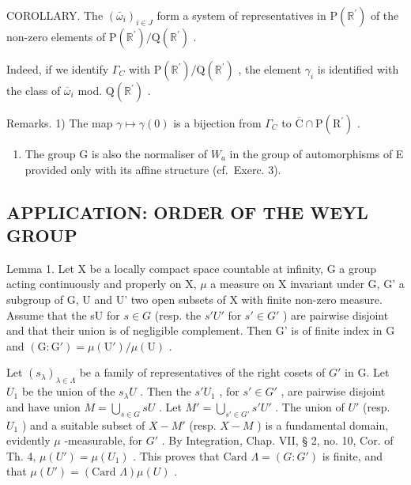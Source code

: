 COROLLARY. The \((\bar{\omega}_i)_{i\in J}\) form a system of representatives in \(\mathrm{P}(\mathbb{R}^{\prime})\) of the non-zero elements of \(\mathrm{P}(\mathbb{R}^{\prime}) / \mathrm{Q}(\mathbb{R}^{\prime})\) .

Indeed, if we identify \(\Gamma_{C}\) with \(\mathrm{P}(\mathbb{R}^{\prime}) / \mathrm{Q}(\mathbb{R}^{\prime})\) , the element \(\gamma_{i}\) is identified with the class of \(\overline{\omega}_{i}\) mod. \(\mathrm{Q}(\mathbb{R}^{\prime})\) .

Remarks. 1) The map \(\gamma \mapsto \gamma(0)\) is a bijection from \(\Gamma_{C}\) to \(\overline{\mathrm{C}} \cap \mathrm{P}(\mathrm{R}^{\prime})\) .

\begin{enumerate}
\def\labelenumi{\arabic{enumi})}
\setcounter{enumi}{1}
\tightlist
\item
  The group G is also the normaliser of \(W_{a}\) in the group of automorphisms of E provided only with its affine structure (cf.~Exerc. 3).
\end{enumerate}

\subsection{APPLICATION: ORDER OF THE WEYL GROUP}

Lemma 1. Let X be a locally compact space countable at infinity, G a group acting continuously and properly on X, \(\mu\) a measure on X invariant under G, G' a subgroup of G, U and U' two open subsets of X with finite non-zero measure. Assume that the sU for \(s \in G\) (resp. the \(s'U'\) for \(s' \in G'\) ) are pairwise disjoint and that their union is of negligible complement. Then G' is of finite index in G and \((\mathrm{G} : \mathrm{G}') = \mu(\mathrm{U}') / \mu(\mathrm{U})\) .

Let \((s_{\lambda})_{\lambda \in \Lambda}\) be a family of representatives of the right cosets of \(G'\) in G. Let \(U_1\) be the union of the \(s_{\lambda}U\) . Then the \(s'U_1\) , for \(s' \in G'\) , are pairwise disjoint and have union \(M = \bigcup_{s \in G} sU\) . Let \(M' = \bigcup_{s' \in G'} s'U'\) . The union of \(U'\) (resp. \(U_1\) ) and a suitable subset of \(X - M'\) (resp. \(X - M\) ) is a fundamental domain, evidently \(\mu\) -measurable, for \(G'\) . By Integration, Chap. VII, § 2, no. 10, Cor. of Th. 4, \(\mu(U') = \mu(U_1)\) . This proves that \(\text{Card } \Lambda = (G : G')\) is finite, and that \(\mu(U') = (\text{Card } \Lambda)\mu(U)\) .

